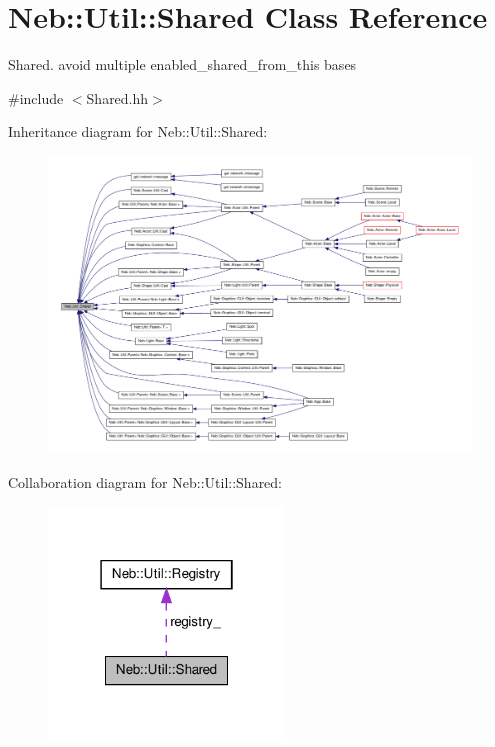 \hypertarget{classNeb_1_1Util_1_1Shared}{\section{\-Neb\-:\-:\-Util\-:\-:\-Shared \-Class \-Reference}
\label{classNeb_1_1Util_1_1Shared}
}


\-Shared. avoid multiple enabled\-\_\-shared\-\_\-from\-\_\-this bases  




{\ttfamily \#include $<$\-Shared.\-hh$>$}



\-Inheritance diagram for \-Neb\-:\-:\-Util\-:\-:\-Shared\-:\nopagebreak
\begin{figure}[H]
\begin{center}
\leavevmode
\includegraphics[width=350pt]{classNeb_1_1Util_1_1Shared__inherit__graph}
\end{center}
\end{figure}


\-Collaboration diagram for \-Neb\-:\-:\-Util\-:\-:\-Shared\-:\nopagebreak
\begin{figure}[H]
\begin{center}
\leavevmode
\includegraphics[width=178pt]{classNeb_1_1Util_1_1Shared__coll__graph}
\end{center}
\end{figure}
